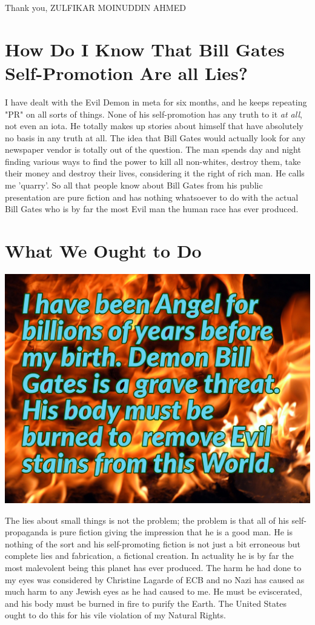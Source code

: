 \documentclass{amsart}
\begin{document}
Thank you,
ZULFIKAR MOINUDDIN AHMED

\section{How Do I Know That Bill Gates Self-Promotion Are all Lies?}

I have dealt with the Evil Demon in meta for six months, and he keeps repeating "PR" on all sorts of things.  None of his self-promotion has any truth to it {\em at all}, not even an iota.  He totally makes up stories about himself that have absolutely no basis in any truth at all.  The idea that Bill Gates would actually look for any newspaper vendor is totally out of the question.  The man spends day and night finding various ways to find the power to kill all non-whites, destroy them, take their money and destroy their lives, considering it the right of rich man.  He calls me 'quarry'.  So all that people know about Bill Gates from his public presentation are pure fiction and has nothing whatsoever to do with the actual Bill Gates who is by far the most Evil man the human race has ever produced.

\section{What We Ought to Do}

\includegraphics[scale=0.65]{fire.jpeg}

The lies about small things is not the problem; the problem is that all of his self-propaganda is pure fiction giving the impression that he is a good man.  He is nothing of the sort and his self-promoting fiction is not just a bit erroneous but complete lies and fabrication, a fictional creation.  In actuality he is by far the most malevolent being this planet has ever produced.  The harm he had done to my eyes was considered by Christine Lagarde of ECB and no Nazi has caused as much harm to any Jewish eyes as he had caused to me.  He must be eviscerated, and his body must be burned in fire to purify the Earth.  The United States ought to do this for his vile violation of my Natural Rights.
\end{document}
